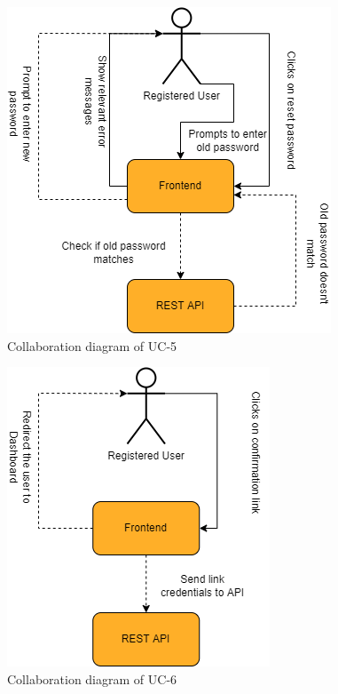 \begin{figure}[H]
    \centering
    \includegraphics[scale=0.5]{./diagrams/collaboration/cd-5.png}
    \caption{Collaboration diagram of UC-5}
    \label{fig:cd-05}
    
\end{figure}


\begin{figure}[H]
    \centering
    \includegraphics[scale=0.5]{./diagrams/collaboration/cd-6.png}
    \caption{Collaboration diagram of UC-6}
    \label{fig:cd-06}
    
\end{figure}


